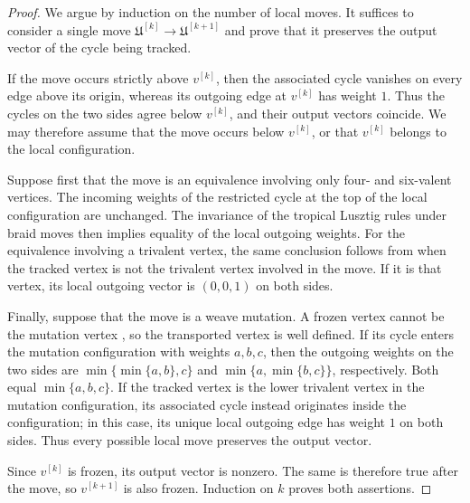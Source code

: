 \documentclass[12pt, reqno]{amsart}
\theoremstyle{plain}
\theoremstyle{definition}
\numberwithin{equation}{section}
\begin{document}
\begin{proof}
We argue by induction on the number of local moves. It suffices to
consider a single move
\(\mathfrak U^{[k]}\to\mathfrak U^{[k+1]}\) and prove that it
preserves the output vector of the cycle being tracked.

If the move occurs strictly above \(v^{[k]}\), then the associated
cycle vanishes on every edge above its origin, whereas its outgoing
edge at \(v^{[k]}\) has weight \(1\). Thus the cycles on the two
sides agree below \(v^{[k]}\), and their output vectors coincide.
We may therefore assume that the move occurs below \(v^{[k]}\), or
that \(v^{[k]}\) belongs to the local configuration.

Suppose first that the move is an equivalence involving only four-
and six-valent vertices. The incoming weights of the restricted cycle
at the top of the local configuration are unchanged. The invariance
of the tropical Lusztig rules under braid moves
\cite[Lemma~4.10]{casals2025cluster} then implies equality of the
local outgoing weights. For the equivalence involving a trivalent
vertex, the same conclusion follows from
\cite[Example~4.12]{casals2025cluster} when the tracked vertex is not
the trivalent vertex involved in the move. If it is that vertex, its
local outgoing vector is \((0,0,1)\) on both sides.

Finally, suppose that the move is a weave mutation. A frozen vertex
cannot be the mutation vertex
\cite[Lemma~4.37(1)]{casals2025cluster}, so the transported vertex is
well defined. If its cycle enters the mutation configuration with
weights \(a,b,c\), then the outgoing weights on the two sides are
\(\min\{\min\{a,b\},c\}\) and
\(\min\{a,\min\{b,c\}\}\), respectively. Both equal
\(\min\{a,b,c\}\). If the tracked vertex is the lower trivalent
vertex in the mutation configuration, its associated cycle instead
originates inside the configuration; in this case, its unique local
outgoing edge has weight \(1\) on both sides. Thus every possible
local move preserves the output vector.

Since \(v^{[k]}\) is frozen, its output vector is nonzero. The same is
therefore true after the move, so \(v^{[k+1]}\) is also frozen.
Induction on \(k\) proves both assertions.
\end{proof}
\end{document}
